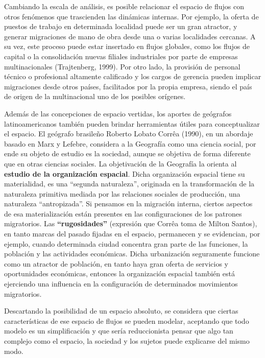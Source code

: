 \documentclass[12pt,spanish,]{article}
\begin{document}
Cambiando la escala de análisis, es posible relacionar el espacio de
flujos con otros fenómenos que trascienden las dinámicas internas. Por
ejemplo, la oferta de puestos de trabajo en determinada localidad puede
ser un gran atractor, y generar migraciones de mano de obra desde una o
varias localidades cercanas. A su vez, este proceso puede estar
insertado en flujos globales, como los flujos de capital o la
consolidación nuevas filiales industriales por parte de empresas
multinacionales (Trajtenberg, 1999). Por otro lado, la provisión de
personal técnico o profesional altamente calificado y los cargos de
gerencia pueden implicar migraciones desde otros países, facilitados por
la propia empresa, siendo el país de origen de la multinacional uno de
los posibles orígenes.

Además de las concepciones de espacio vertidas, los aportes de geógrafos
latinoamericanos también pueden brindar herramientas útiles para
conceptualizar el espacio. El geógrafo brasileño Roberto Lobato Corrêa
(1990), en un abordaje basado en Marx y Lefebre, considera a la
Geografía como una ciencia social, por ende su objeto de estudio es la
sociedad, aunque se objetiva de forma diferente que en otras ciencias
sociales. La objetivación de la Geografía la orienta al \textbf{estudio
de la organización espacial}. Dicha organización espacial tiene su
materialidad, es una ``segunda naturaleza'', originada en la
transformación de la naturaleza primitiva mediada por las relaciones
sociales de producción, una naturaleza ``antropizada''. Si pensamos en
la migración interna, ciertos aspectos de esa materialización están
presentes en las configuraciones de los patrones migratorios. Las
\textbf{``rugosidades''} (expresión que Corrêa toma de Milton Santos),
en tanto marcas del pasado fijadas en el espacio, permanecen y se
evidencian, por ejemplo, cuando determinada ciudad concentra gran parte
de las funciones, la población y las actividades económicas. Dicha
urbanización seguramente funcione como un atractor de población, en
tanto haya gran oferta de servicios y oportunidades económicas, entonces
la organización espacial también está ejerciendo una influencia en la
configuración de determinados movimientos migratorios.

Descartando la posibilidad de un espacio absoluto, se considera que
ciertas características de ese espacio de flujos se pueden modelar,
aceptando que todo modelo es un simplificación y que sería reduccionista
pensar que algo tan complejo como el espacio, la sociedad y los sujetos
puede explicarse del mismo modo.
\end{document}
